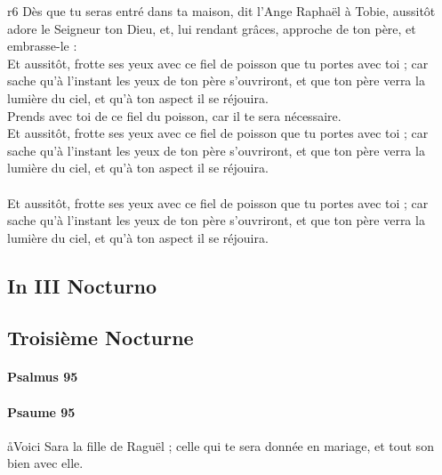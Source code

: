\documentclass[twoside]{article}
\begin{document}
\begin{paracol}[1]{2}
{	}
	{r6}
	{\rr Dès que tu seras entré dans ta maison, dit l’Ange Raphaël à Tobie, aussitôt adore le Seigneur ton Dieu, et, lui rendant grâces, approche de ton père, et embrasse-le :\\
	\GreSpecial{*} Et aussitôt, frotte ses yeux avec ce fiel de poisson que tu portes avec toi ; car sache qu’à l’instant les yeux de ton père s’ouvriront, et que ton père verra la lumière du ciel, et qu’à ton aspect il se réjouira.\\
	\vv Prends avec toi de ce fiel du poisson, car il te sera nécessaire.\\
	\GreSpecial{*} Et aussitôt, frotte ses yeux avec ce fiel de poisson que tu portes avec toi ; car sache qu’à l’instant les yeux de ton père s’ouvriront, et que ton père verra la lumière du ciel, et qu’à ton aspect il se réjouira.\\
	\versetGloireAuPere{}\\
	\GreSpecial{*} Et aussitôt, frotte ses yeux avec ce fiel de poisson que tu portes avec toi ; car sache qu’à l’instant les yeux de ton père s’ouvriront, et que ton père verra la lumière du ciel, et qu’à ton aspect il se réjouira.}

\subsection{In III Nocturno}

\switchcolumn

\subsection{Troisième Nocturne}

\switchcolumn*

\paragraph{Psalmus 95}


\begin{enumerate}[wide, itemsep=0mm, labelwidth=!, labelindent=0pt, label=\color{gregoriocolor}\theenumi]


\end{enumerate}

\switchcolumn

\paragraph{Psaume 95}
\aa Voici Sara la fille de Raguël ; celle qui te sera donnée en mariage, et tout son bien avec elle.


\end{paracol}
\end{document}
